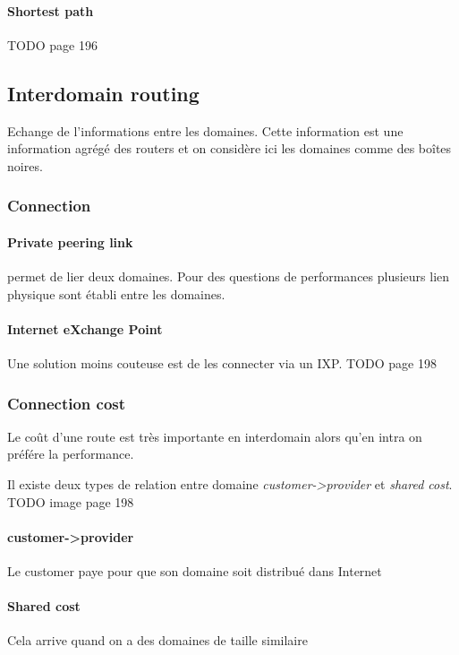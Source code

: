 \paragraph{Shortest path}
TODO page 196

\subsection{Interdomain routing}
Echange de l'informations entre les domaines. Cette information est une information
agrégé des routers et on considère ici les domaines comme des boîtes noires.

\subsubsection{Connection}

\paragraph{Private peering link} permet de lier deux domaines. Pour des questions
de performances plusieurs lien physique sont établi entre les domaines.

\paragraph{Internet eXchange Point} Une solution moins couteuse est de les connecter
via un IXP. TODO page 198

\subsubsection{Connection cost} Le coût d'une route est très importante en interdomain
alors qu'en intra on préfére la performance.

Il existe deux types de relation entre domaine \textit{customer->provider} et \textit{
shared cost}.
TODO image page 198

\paragraph{customer->provider}
Le customer paye pour que son domaine soit distribué dans Internet

\paragraph{Shared cost}
Cela arrive quand on a des domaines de taille similaire

